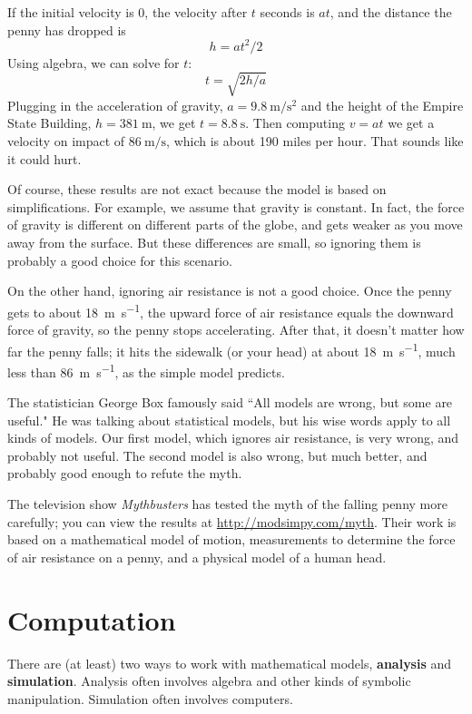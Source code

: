 \documentclass[12pt]{book}
\theoremstyle{exercise}
\begin{document}
If the initial velocity is 0, the velocity after $t$ seconds is $a t$, and the distance the penny has dropped is
%
\[ h = a t^2 / 2 \]
%
Using algebra, we can solve for $t$:
%
\[ t = \sqrt{ 2 h / a} \]
%
Plugging in the acceleration of gravity, $a = \SI{9.8}{\meter\per\second\squared}$ and the height of the Empire State Building, $h=\SI{381}{\meter}$, we get $t = \SI{8.8}{\second}$.  Then computing $v = a t$ we get a velocity on impact of $\SI{86}{\meter\per\second}$, which is about 190 miles per hour.  That sounds like it could hurt.

Of course, these results are not exact because the model is based on simplifications.  For example, we assume that gravity is constant.  In fact, the force of gravity is different on different parts of the globe, and gets weaker as you move away from the surface.  But these differences are small, so ignoring them is probably a good choice for this scenario.

On the other hand, ignoring air resistance is not a good choice.  Once the penny gets to about \SI{18}{\meter\per\second}, the upward force of air resistance equals the downward force of gravity, so the penny stops accelerating.  After that, it doesn't matter how far the penny falls; it hits the sidewalk (or your head) at about \SI{18}{\meter\per\second}, much less than \SI{86}{\meter\per\second}, as the simple model predicts.

The statistician George Box famously said ``All models are wrong, but some are useful."  He was talking about statistical models, but his wise words apply to all kinds of models.  Our first model, which ignores air resistance, is very wrong, and probably not useful.  The second model is also wrong, but much better, and probably good enough to refute the myth.

The television show {\it Mythbusters} has tested the myth of the falling penny more carefully; you can view the results at \url{http://modsimpy.com/myth}.  Their work is based on a mathematical model of motion, measurements to determine the force of air resistance on a penny, and a physical model of a human head.


\section{Computation}
\label{computation}

There are (at least) two ways to work with mathematical models, {\bf analysis} and {\bf simulation}.  Analysis often involves algebra and other kinds of symbolic manipulation.  Simulation often involves computers.
\end{document}

